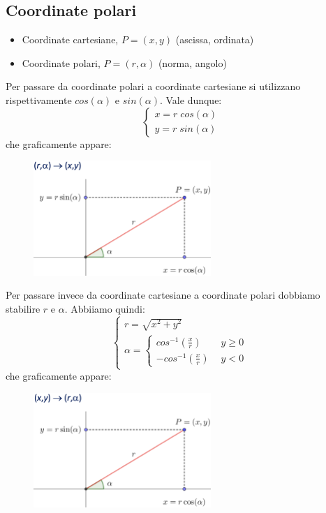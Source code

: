 \documentclass[../main.tex]{subfiles}
\begin{document}
\subsection{Coordinate polari}
\begin{itemize}
    \item Coordinate cartesiane, $P=(x,y)$ (ascissa, ordinata)
    \item Coordinate polari, $P=(r,\alpha)$ (norma, angolo)
\end{itemize}
\vspace{1cm}

Per passare da coordinate polari a coordinate cartesiane si utilizzano rispettivamente $cos(\alpha)$ e $sin(\alpha)$. Vale dunque:
$$
    \begin{cases}
        x = r\phantom{.}cos(\alpha) \\
        y = r\phantom{.}sin(\alpha)
    \end{cases}
$$
che graficamente appare:
\begin{figure}[h]
    \centering
    \includegraphics[width=0.6\textwidth]{../images/polariCartesiane.png}
\end{figure}

\vspace{2cm}
Per passare invece da coordinate cartesiane a coordinate polari dobbiamo stabilire $r$ e $\alpha$. Abbiiamo quindi:
$$
    \begin{cases}
        r = \sqrt{x^2 + y^2} \\
        \alpha = \begin{cases}
            cos^{-1}(\frac{x}{r}) \phantom{--} y \geq 0 \\
            -cos^{-1}(\frac{x}{r}) \phantom{-} y < 0
        \end{cases}
    \end{cases}
$$
che graficamente appare:
\begin{figure}[h]
    \centering
    \includegraphics[width=0.6\textwidth]{../images/cartesianePolari.png}
\end{figure}
\end{document}
